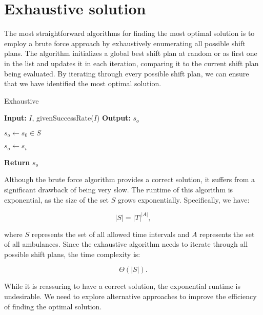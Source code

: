 \newpage

\section{Exhaustive solution}

The most straightforward algorithms for finding the most optimal solution is to
employ a brute force approach by exhaustively enumerating all possible shift
plans. The algorithm initializes a global best shift plan at random or as first
one in the list and updates it in each iteration, comparing it to the current
shift plan being evaluated. By iterating through every possible shift plan, we
can ensure that we have identified the most optimal solution.

\begin{algorithm}
    \caption{Exhaustive}
    \label{alg:name}
    \begin{algorithmic}[1]
        \STATE \textbf{Input:} $I$, givenSuccessRate($I$)
        \STATE \textbf{Output:} $s_o$

        \STATE $s_o \leftarrow s_0 \in S$

        \STATE $s_o \leftarrow s_i$
        \ENDIF
        \ENDFOR

        \STATE \textbf{Return} $s_o$
    \end{algorithmic}
\end{algorithm}

Although the brute force algorithm provides a correct solution, it suffers from
a significant drawback of being very slow. The runtime of this algorithm is
exponential, as the size of the set $S$ grows exponentially. Specifically, we
have:

\[
    |S| = |T|^{|A|},
\]

where $S$ represents the set of all allowed time intervals and $A$ represents
the set of all ambulances. Since the exhaustive algorithm needs to iterate
through all possible shift plans, the time complexity is:

\[
    \Theta(|S|).
\]

While it is reassuring to have a correct solution, the exponential runtime is
undesirable. We need to explore alternative approaches to improve the
efficiency of finding the optimal solution.